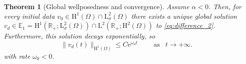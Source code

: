 \documentclass[preprint]{elsarticle}
\newtheorem{thm}{Theorem}[section]
\newtheorem{prop}[prop]{Proposition}
\numberwithin{equation}{section}
\newcommand {\R}	{\mathbb{R}}
\newcommand {\E}	{\mathbb{E}}
\renewcommand{\H}{\mathrm{H}}
\newcommand{\sigmabar}{\bar{\sigma}}
\renewcommand{\bar}[1]{\overline{#1}}
\newcommand{\rL}{\mathrm{L}}
\newcommand{\rH}{\H}
\newcommand{\rB}{\mathrm{B}}
\newcommand{\rE}{\mathrm{E}}
\newcommand{\rBrpq}[3]{\rB^{{#1}}_{{#2}{#3}}}
\begin{document}
\begin{thm}[Global wellposedness and convergence]\label{thm:global_2}
	Assume $\alpha < 0$. %
	Then, for every initial data $v_0 \in \rH^1(\Omega)\cap \rL^2_{\sigmabar}(\Omega)$ there exists a unique global solution $v_d \in \E_1=  \rH^{1}(\R_+;\rL^2_{\sigmabar}(\Omega)) \cap \rL^{2}(\R_+;\rH^{2}(\Omega))$ to \eqref{eq:difference_2}. Furthermore, this solution decays exponentially, so
	\begin{equation*}
		\| v_d(t) \|_{\rH^1(\Omega)} \leq C \mathrm{e}^{\omega_0 t}
		\qquad \text{ as } \enspace t \to +\infty. 
	\end{equation*} 	
	with rate $\omega_0 < 0$.
\end{thm}
\end{document}
